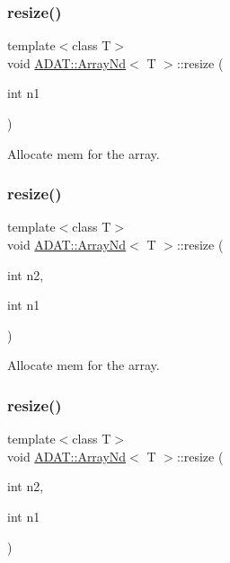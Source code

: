 \subsubsection{\texorpdfstring{resize()}{resize()}\hspace{0.1cm}{\footnotesize\ttfamily [6/15]}}
{\footnotesize\ttfamily template$<$class T$>$ \\
void \mbox{\hyperlink{classADAT_1_1ArrayNd}{A\+D\+A\+T\+::\+Array\+Nd}}$<$ T $>$\+::resize (\begin{DoxyParamCaption}\item[{int}]{n1 }\end{DoxyParamCaption})\hspace{0.3cm}{\ttfamily [inline]}}



Allocate mem for the array. 

\mbox{\label{classADAT_1_1ArrayNd_ac66a29c373d99ae8ead2344c1024489e}} 
\subsubsection{\texorpdfstring{resize()}{resize()}\hspace{0.1cm}{\footnotesize\ttfamily [7/15]}}
{\footnotesize\ttfamily template$<$class T$>$ \\
void \mbox{\hyperlink{classADAT_1_1ArrayNd}{A\+D\+A\+T\+::\+Array\+Nd}}$<$ T $>$\+::resize (\begin{DoxyParamCaption}\item[{int}]{n2,  }\item[{int}]{n1 }\end{DoxyParamCaption})\hspace{0.3cm}{\ttfamily [inline]}}



Allocate mem for the array. 

\mbox{\label{classADAT_1_1ArrayNd_ac66a29c373d99ae8ead2344c1024489e}} 
\subsubsection{\texorpdfstring{resize()}{resize()}\hspace{0.1cm}{\footnotesize\ttfamily [8/15]}}
{\footnotesize\ttfamily template$<$class T$>$ \\
void \mbox{\hyperlink{classADAT_1_1ArrayNd}{A\+D\+A\+T\+::\+Array\+Nd}}$<$ T $>$\+::resize (\begin{DoxyParamCaption}\item[{int}]{n2,  }\item[{int}]{n1 }\end{DoxyParamCaption})\hspace{0.3cm}{\ttfamily [inline]}}




